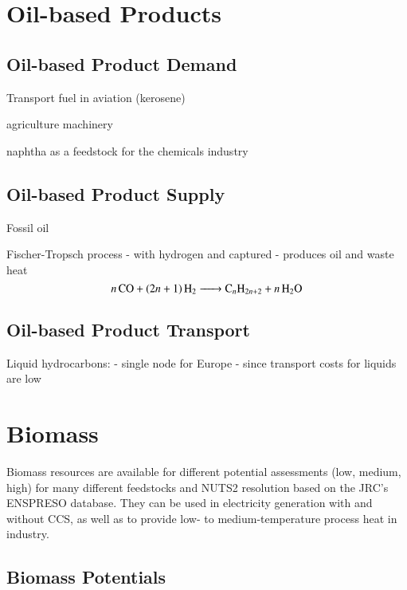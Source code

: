 \section{Oil-based Products}

\subsection{Oil-based Product Demand}

Transport fuel in aviation (kerosene)

agriculture machinery

naphtha as a feedstock for the chemicals industry

\subsection{Oil-based Product Supply}

Fossil oil

Fischer-Tropsch process
- with hydrogen and captured \co
- produces oil and waste heat
\begin{equation}
    \ce{$n$CO + ($2n$ + 1)H2 -> C_$n$H_{2n+2} + $n$H2O}
\end{equation}


\subsection{Oil-based Product Transport}

Liquid hydrocarbons:
- single node for Europe
- since transport costs for liquids are low


\section{Biomass}

Biomass resources are available for different potential assessments (low,
medium, high) for many different feedstocks and NUTS2 resolution based on the
JRC’s ENSPRESO database. They can be used in electricity generation with and
without CCS, as well as to provide low- to medium-temperature process heat in
industry.

\subsection{Biomass Potentials}

